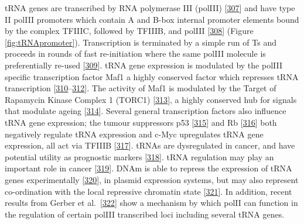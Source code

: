 \documentclass[
]{book}
\begin{document}
tRNA genes are transcribed by RNA polymerase III (polIII) {[}\protect\hyperlink{ref-Schramm2002}{307}{]} and have type II polIII promoters which contain A and B-box internal promoter elements bound by the complex TFIIIC, followed by TFIIIB, and polIII {[}\protect\hyperlink{ref-Canella2010}{308}{]} (Figure \ref{fig:tRNApromoter}).
Transcription is terminated by a simple run of Ts and proceeds in rounds of fast re-initiation where the same polIII molecule is preferentially re-used {[}\protect\hyperlink{ref-Dieci1996}{309}{]}.
tRNA gene expression is modulated by the polIII specific transcription factor Maf1 a highly conserved factor which represses tRNA transcription {[}\protect\hyperlink{ref-Murawski1994}{310}--\protect\hyperlink{ref-Vorlander2020}{312}{]}.
The activity of Maf1 is modulated by the Target of Rapamycin Kinase Complex 1 (TORC1) {[}\protect\hyperlink{ref-Mange2017}{313}{]}, a highly conserved hub for signals that modulate ageing {[}\protect\hyperlink{ref-Kennedy2016}{314}{]}.
Several general transcription factors also influence tRNA gene expression; the tumour suppressors p53 {[}\protect\hyperlink{ref-Crighton2003}{315}{]} and Rb {[}\protect\hyperlink{ref-Sutcliffe2000}{316}{]} both negatively regulate tRNA expression and c-Myc upregulates tRNA gene expression, all act via TFIIIB {[}\protect\hyperlink{ref-Gomez-Roman2003}{317}{]}.
tRNAs are dysregulated in cancer, and have potential utility as prognostic markers {[}\protect\hyperlink{ref-Krishnan2016}{318}{]}.
tRNA regulation may play an important role in cancer {[}\protect\hyperlink{ref-Huang2018}{319}{]}.
DNAm is able to repress the expression of tRNA genes experimentally {[}\protect\hyperlink{ref-Besser1990}{320}{]}, in plasmid expression systems, but may also represent co-ordination with the local repressive chromatin state {[}\protect\hyperlink{ref-Varshney2015}{321}{]}.
In addition, recent results from Gerber et al.~{[}\protect\hyperlink{ref-Gerber2020}{322}{]} show a mechanism by which polII can function in the regulation of certain polIII transcribed loci including several tRNA genes.
\end{document}
